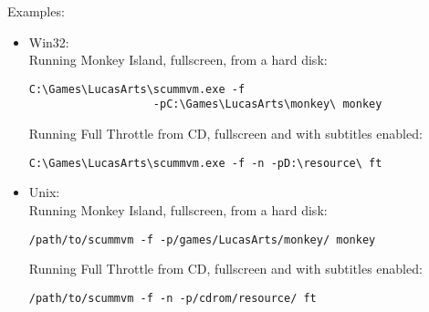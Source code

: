 Examples:
\begin{itemize}
\item Win32:\\
Running Monkey Island, fullscreen, from a hard disk:
\begin{verbatim}
C:\Games\LucasArts\scummvm.exe -f 
                   -pC:\Games\LucasArts\monkey\ monkey
\end{verbatim}
  Running Full Throttle from CD, fullscreen and with subtitles enabled:
\begin{verbatim}
C:\Games\LucasArts\scummvm.exe -f -n -pD:\resource\ ft
\end{verbatim}
 \item Unix:\\
  Running Monkey Island, fullscreen, from a hard disk:
\begin{verbatim}
/path/to/scummvm -f -p/games/LucasArts/monkey/ monkey
\end{verbatim}
  Running Full Throttle from CD, fullscreen and with subtitles enabled:
\begin{verbatim}
/path/to/scummvm -f -n -p/cdrom/resource/ ft
\end{verbatim}
\end{itemize}
